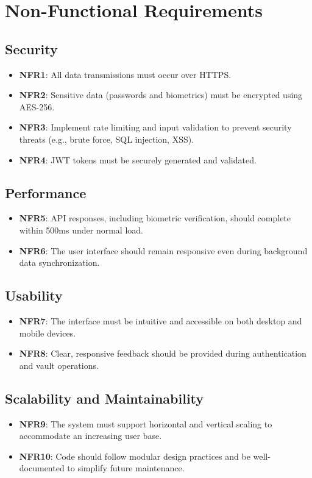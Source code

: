 \documentclass{scrreprt}
\begin{document}
\chapter{Non-Functional Requirements}
\section{Security}
\begin{itemize}
    \item \textbf{NFR1}: All data transmissions must occur over HTTPS.
    \item \textbf{NFR2}: Sensitive data (passwords and biometrics) must be encrypted using AES-256.
    \item \textbf{NFR3}: Implement rate limiting and input validation to prevent security threats (e.g., brute force, SQL injection, XSS).
    \item \textbf{NFR4}: JWT tokens must be securely generated and validated.
\end{itemize}

\section{Performance}
\begin{itemize}
    \item \textbf{NFR5}: API responses, including biometric verification, should complete within 500ms under normal load.
    \item \textbf{NFR6}: The user interface should remain responsive even during background data synchronization.
\end{itemize}

\section{Usability}
\begin{itemize}
    \item \textbf{NFR7}: The interface must be intuitive and accessible on both desktop and mobile devices.
    \item \textbf{NFR8}: Clear, responsive feedback should be provided during authentication and vault operations.
\end{itemize}

\section{Scalability and Maintainability}
\begin{itemize}
    \item \textbf{NFR9}: The system must support horizontal and vertical scaling to accommodate an increasing user base.
    \item \textbf{NFR10}: Code should follow modular design practices and be well-documented to simplify future maintenance.
\end{itemize}
\end{document}
